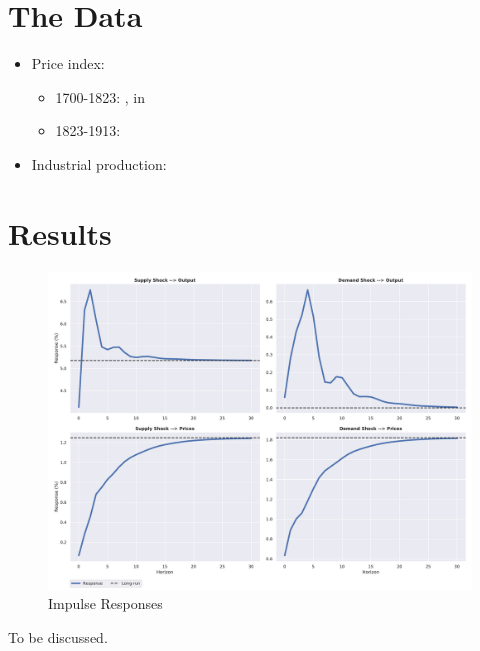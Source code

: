 \documentclass[a4paper,12pt]{article}
\begin{document}
\section{The Data\label{sec:data}}

\begin{itemize}
\item Price index:
\begin{itemize}
\item 1700-1823: \citet{schumpeter38}, in \citet[p. 468-469]{mitchelldeane71}
\item 1823-1913: \citet[p. 863-864]{mitchelle2003}
\end{itemize}

\item Industrial production: \citet[p. 725-727]{craftsharley92}

\end{itemize}

\section{Results}

\begin{figure}[H]
    \centering
\caption{Impulse Responses}
    \includegraphics[width=\textwidth]{../output/figures/IR.pdf} 
\end{figure}

To be discussed.

\pagebreak



\end{document}
